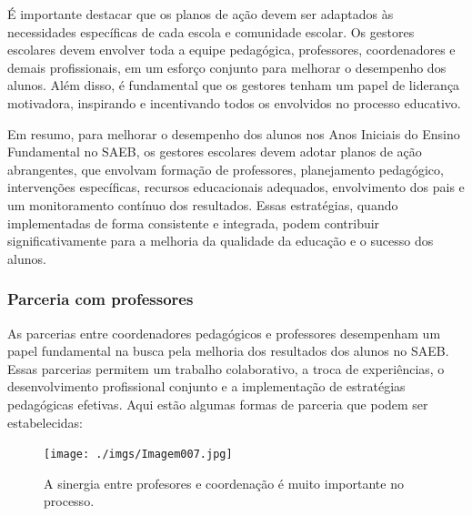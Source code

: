É importante destacar que os planos de ação devem ser adaptados às
necessidades específicas de cada escola e comunidade escolar. Os
gestores escolares devem envolver toda a equipe pedagógica, professores,
coordenadores e demais profissionais, em um esforço conjunto para
melhorar o desempenho dos alunos. Além disso, é fundamental que os
gestores tenham um papel de liderança motivadora, inspirando e
incentivando todos os envolvidos no processo educativo.

Em resumo, para melhorar o desempenho dos alunos nos Anos Iniciais do
Ensino Fundamental no SAEB, os gestores escolares devem adotar planos de
ação abrangentes, que envolvam formação de professores, planejamento
pedagógico, intervenções específicas, recursos educacionais adequados,
envolvimento dos pais e um monitoramento contínuo dos resultados. Essas
estratégias, quando implementadas de forma consistente e integrada,
podem contribuir significativamente para a melhoria da qualidade da
educação e o sucesso dos alunos.

\subsubsection{Parceria com
professores}\label{parceria-com-professores}

As parcerias entre coordenadores pedagógicos e professores desempenham
um papel fundamental na busca pela melhoria dos resultados dos alunos no
SAEB. Essas parcerias permitem um trabalho colaborativo, a troca de
experiências, o desenvolvimento profissional conjunto e a implementação
de estratégias pedagógicas efetivas. Aqui estão algumas formas de
parceria que podem ser estabelecidas:

\begin{figure}
\centering
\texttt{[image: ./imgs/Imagem007.jpg]}
\caption{A sinergia entre profesores e coordenação é muito importante no
processo.}
\end{figure}

